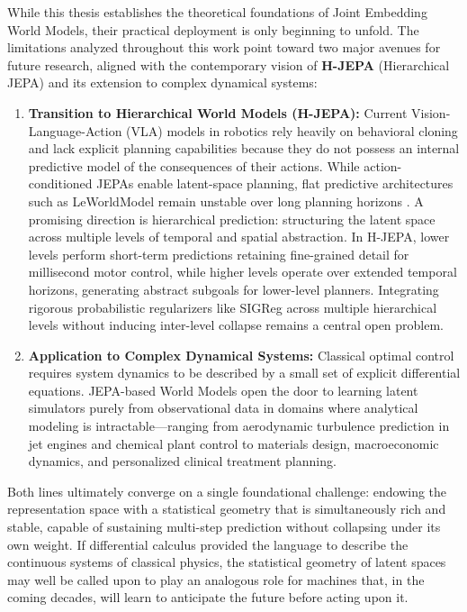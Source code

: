 \documentclass[11pt, oneside, openany]{book}
\begin{document}
While this thesis establishes the theoretical foundations of Joint Embedding World Models, their practical deployment is only beginning to unfold. The limitations analyzed throughout this work point toward two major avenues for future research, aligned with the contemporary vision of \textbf{H-JEPA} (Hierarchical JEPA) and its extension to complex dynamical systems:

\begin{enumerate}
    \item \textbf{Transition to Hierarchical World Models (H-JEPA):} Current Vision-Language-Action (VLA) models in robotics rely heavily on behavioral cloning and lack explicit planning capabilities because they do not possess an internal predictive model of the consequences of their actions. While action-conditioned JEPAs enable latent-space planning, flat predictive architectures such as LeWorldModel remain unstable over long planning horizons \cite{klindt2026when}. A promising direction is hierarchical prediction: structuring the latent space across multiple levels of temporal and spatial abstraction. In H-JEPA, lower levels perform short-term predictions retaining fine-grained detail for millisecond motor control, while higher levels operate over extended temporal horizons, generating abstract subgoals for lower-level planners. Integrating rigorous probabilistic regularizers like SIGReg across multiple hierarchical levels without inducing inter-level collapse remains a central open problem.
    \item \textbf{Application to Complex Dynamical Systems:} Classical optimal control requires system dynamics to be described by a small set of explicit differential equations. JEPA-based World Models open the door to learning latent simulators purely from observational data in domains where analytical modeling is intractable---ranging from aerodynamic turbulence prediction in jet engines and chemical plant control to materials design, macroeconomic dynamics, and personalized clinical treatment planning.
\end{enumerate}

Both lines ultimately converge on a single foundational challenge: endowing the representation space with a statistical geometry that is simultaneously rich and stable, capable of sustaining multi-step prediction without collapsing under its own weight. If differential calculus provided the language to describe the continuous systems of classical physics, the statistical geometry of latent spaces may well be called upon to play an analogous role for machines that, in the coming decades, will learn to anticipate the future before acting upon it.
\end{document}
